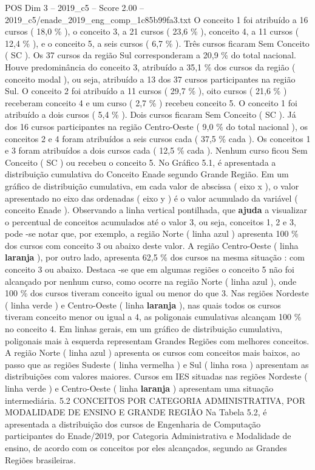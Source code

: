 \begin{textsample}{POS Dim 3 – 2019\_c5 – Score 2.00 – 2019\_c5/enade\_2019\_eng\_comp\_1c85b99fa3.txt}
O conceito 1 foi atribuído a 16 cursos ( 18,0 \% ), o conceito 3, a 21 cursos ( 23,6 \% ), conceito 4, a 11 cursos ( 12,4 \% ), e o conceito 5, a seis cursos ( 6,7 \% ).
Três cursos ficaram Sem Conceito ( SC ).
Os 37 cursos da região Sul corresponderam a 20,9 \% do total nacional.
Houve predominância do conceito 3, atribuído a 35,1 \% dos cursos da região ( conceito modal ), ou seja, atribuído a 13 dos 37 cursos participantes na região Sul.
O conceito 2 foi atribuído a 11 cursos ( 29,7 \% ), oito cursos ( 21,6 \% ) receberam conceito 4 e um curso ( 2,7 \% ) recebeu conceito 5.
O conceito 1 foi atribuído a dois cursos ( 5,4 \% ).
Dois cursos ficaram Sem Conceito ( SC ).
Já dos 16 cursos participantes na região Centro-Oeste ( 9,0 \% do total nacional ), os conceitos 2 e 4 foram atribuídos a seis cursos cada ( 37,5 \% cada ).
Os conceitos 1 e 3 foram atribuídos a dois cursos cada ( 12,5 \% cada ).
Nenhum curso ficou Sem Conceito ( SC ) ou recebeu o conceito 5.
No Gráfico 5.1, é apresentada a distribuição cumulativa do Conceito Enade segundo Grande Região.
Em um gráfico de distribuição cumulativa, em cada valor de abscissa ( eixo x ), o valor apresentado no eixo das ordenadas ( eixo y ) é o valor acumulado da variável ( conceito Enade ).
Observando a linha vertical pontilhada, que \textbf{ajuda} a visualizar o percentual de conceitos acumulados até o valor 3, ou seja, conceitos 1, 2 e 3, pode -se notar que, por exemplo, a região Norte ( linha azul ) apresenta 100 \% dos cursos com conceito 3 ou abaixo deste valor.
A região Centro-Oeste ( linha \textbf{laranja} ), por outro lado, apresenta 62,5 \% dos cursos na mesma situação : com conceito 3 ou abaixo.
Destaca -se que em algumas regiões o conceito 5 não foi alcançado por nenhum curso, como ocorre na região Norte ( linha azul ), onde 100 \% dos cursos tiveram conceito igual ou menor do que 3.
Nas regiões Nordeste ( linha verde ) e Centro-Oeste ( linha \textbf{laranja} ), nas quais todos os cursos tiveram conceito menor ou igual a 4, as poligonais cumulativas alcançam 100 \% no conceito 4.
Em linhas gerais, em um gráfico de distribuição cumulativa, poligonais mais à esquerda representam Grandes Regiões com melhores conceitos.
A região Norte ( linha azul ) apresenta os cursos com conceitos mais baixos, ao passo que as regiões Sudeste ( linha vermelha ) e Sul ( linha rosa ) apresentam as distribuições com valores maiores.
Cursos em IES situadas nas regiões Nordeste ( linha verde ) e Centro-Oeste ( linha \textbf{laranja} ) apresentam uma situação intermediária. 5.2 CONCEITOS POR CATEGORIA ADMINISTRATIVA, POR MODALIDADE DE ENSINO E GRANDE REGIÃO Na Tabela 5.2, é apresentada a distribuição dos cursos de Engenharia de Computação participantes do Enade/2019, por Categoria Administrativa e Modalidade de ensino, de acordo com os conceitos por eles alcançados, segundo as Grandes Regiões brasileiras.

\end{textsample}

